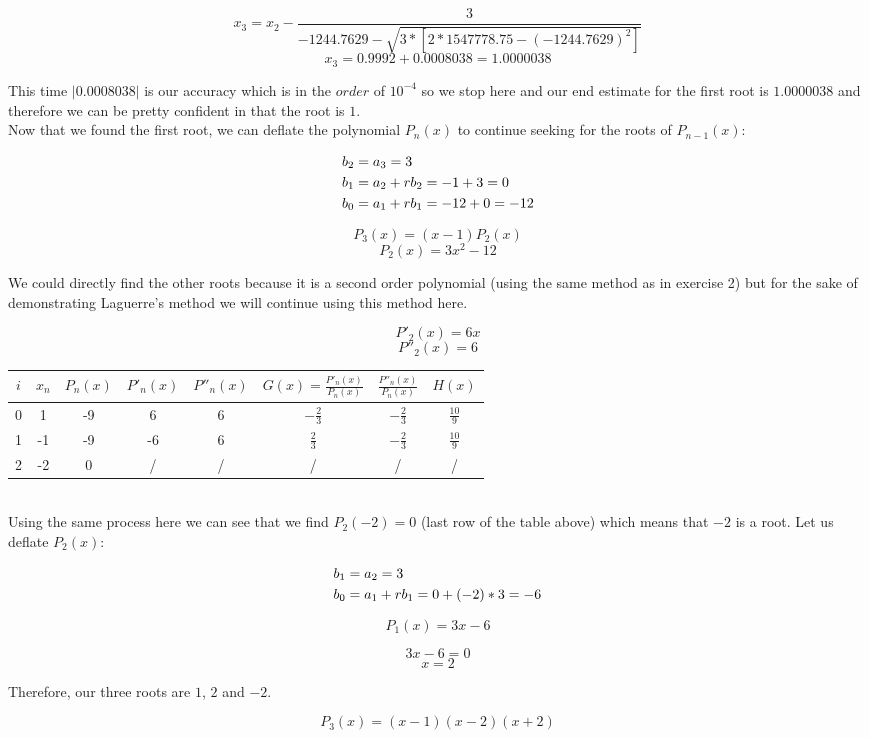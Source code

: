 \documentclass[12pt]{article}
\begin{document}
$$ x_3 = x_2 - \frac{ 3 }{ -1244.7629 - \sqrt{ 3 * [2 * 1547778.75 - (-1244.7629)^2] } } $$
$$ x_3 = 0.9992 + 0.0008038 = 1.0000038 $$

This time $|0.0008038|$ is our accuracy which is in the $order$ of $10^{-4}$ so we stop here and our end estimate for the first root is $1.0000038$ and therefore we can be pretty confident in that the root is $1$. \\

Now that we found the first root, we can deflate the polynomial $P_n(x)$ to continue seeking for the roots of $P_{n-1}(x)$:

\begin{align}
b_2 &= a_3 = 3 \notag \\
b_1 &= a_2 + rb_2 = -1+3 = 0 \notag \\
b_0 &= a_1 + rb_1 = -12 + 0 = -12 \notag
\end{align}

$$ P_3(x) = (x-1)P_2(x) $$
$$ P_2(x) = 3x^2-12 $$

We could directly find the other roots because it is a second order polynomial (using the same method as in exercise 2) but for the sake of demonstrating Laguerre's method we will continue using this method here.

$$ P'_2(x) = 6x  $$
$$ P''_2(x) = 6  $$

\begin{tabular}{|c|c|c|c|c|c|c|c|}
  \hline
  $i$ & $x_n$ & $P_n(x)$ & $P'_n(x)$ & $P''_n(x)$ & $G(x)=\frac{ P'_n(x) }{ P_n(x) }$ & $\frac{ P''_n(x) }{ P_n(x) }$ & $H(x)$ \\ \hline
  0 & 1 & -9 & 6 & 6 & $-\frac{2}{3}$ & $-\frac{2}{3}$ & $\frac{10}{9}$ \\ \hline
  1 & -1 & -9 & -6 & 6 & $\frac{2}{3}$ & $-\frac{2}{3}$ & $\frac{10}{9}$ \\ \hline
  2 & -2 & 0 & / & / & / & / & / \\ \hline
\end{tabular} \\

Using the same process here we can see that we find $P_2(-2) = 0$ (last row of the table above) which means that $-2$ is a root. Let us deflate $P_2(x)$:

\begin{align}
b_1 &= a_2 = 3 \notag \\
b_0 &= a_1 + rb_1 = 0 + (-2)*3 = -6 \notag
\end{align}

$$ P_1(x) = 3x-6 $$

$$ 3x-6 = 0 $$
$$ x = 2 $$

Therefore, our three roots are $1$, $2$ and $-2$.

$$ P_3(x) = (x-1)(x-2)(x+2) $$
\end{document}
